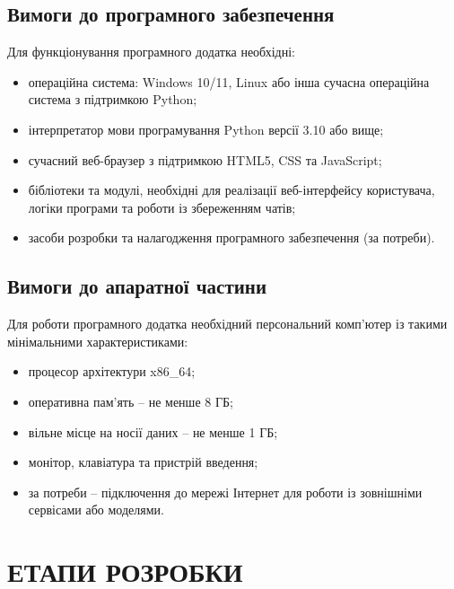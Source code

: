 \documentclass[12pt,a4paper]{article}
\begin{document}
    \subsection{Вимоги до програмного забезпечення}

    Для функціонування програмного додатка необхідні:

    \begin{itemize}
        \item операційна система: Windows 10/11, Linux або інша сучасна операційна система з підтримкою Python;
        \item інтерпретатор мови програмування Python версії 3.10 або вище;
        \item сучасний веб-браузер з підтримкою HTML5, CSS та JavaScript;
        \item бібліотеки та модулі, необхідні для реалізації веб-інтерфейсу користувача, логіки програми та роботи із збереженням чатів;
        \item засоби розробки та налагодження програмного забезпечення (за потреби).
    \end{itemize}

    \subsection{Вимоги до апаратної частини}

    Для роботи програмного додатка необхідний персональний комп'ютер
    із такими мінімальними характеристиками:

    \begin{itemize}
        \item процесор архітектури x86\_64;
        \item оперативна пам'ять -- не менше 8 ГБ;
        \item вільне місце на носії даних -- не менше 1 ГБ;
        \item монітор, клавіатура та пристрій введення;
        \item за потреби -- підключення до мережі Інтернет для роботи із зовнішніми сервісами або моделями.
    \end{itemize}

    \section{ЕТАПИ РОЗРОБКИ}
\end{document}
